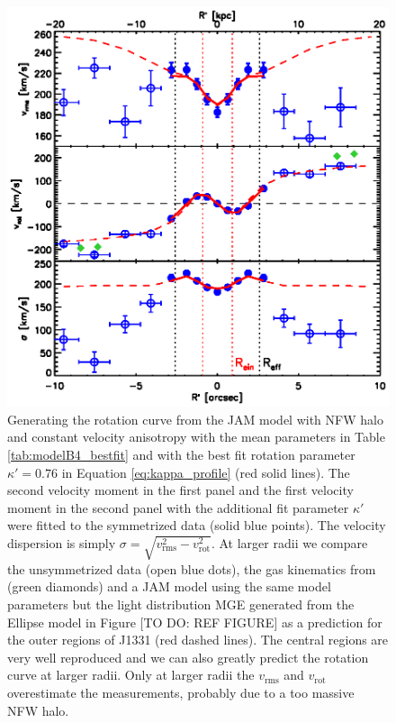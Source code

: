 \begin{figure}
\centering
\includegraphics[width=0.7\linewidth]{fig/B4_rms_rot_curves_best_model.ps}
\caption{Generating the rotation curve from the JAM model with NFW halo and constant velocity anisotropy with the mean parameters in Table \ref{tab:modelB4_bestfit} and with the best fit rotation parameter $\kappa' = 0.76$ in Equation \ref{eq:kappa_profile} (red solid lines). The second velocity moment in the first panel and the first velocity moment in the second panel with the additional fit parameter $\kappa'$ were fitted to the symmetrized data (solid blue points). The velocity dispersion is simply $\sigma = \sqrt{v_\text{rms}^2 - v_\text{rot}^2}$. At larger radii we compare the unsymmetrized data (open blue dots), the gas kinematics from \citet{SWELLSV} (green diamonds) and a JAM model using the same model parameters but the light distribution MGE generated from the Ellipse model in Figure [TO DO: REF FIGURE] as a prediction for the outer regions of J1331 (red dashed lines). The central regions are very well reproduced and we can also greatly predict the rotation curve at larger radii. Only at larger radii the $v_\text{rms}$ and $v_\text{rot}$ overestimate the measurements, probably due to a too massive NFW halo.}
\label{fig:modelB4_vrot}
\end{figure}
